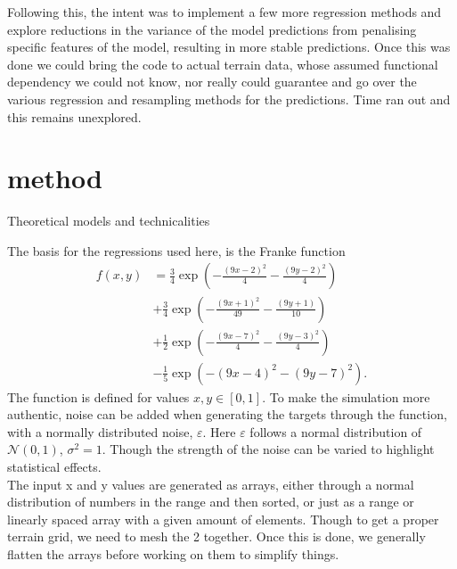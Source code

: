 \documentclass[12pt]{revtex4-2}
\begin{document}
Following this, the intent was to implement a few more regression methods and explore
reductions in the variance of the model predictions from penalising specific features 
of the model, resulting in more stable predictions. Once this was done we could bring the
code to actual terrain data, whose assumed functional dependency we could not know, nor
really could guarantee and go over the various regression and resampling methods for 
the predictions. Time ran out and this remains unexplored. 

\section{method}
Theoretical models and technicalities

The basis for the regressions used here, is the Franke function\cite{franke1979critical}
\begin{align}
 f(x,y) &= \frac{3}{4}\exp{\left(-\frac{(9x-2)^2}{4} - \frac{(9y-2)^2}{4}\right)} 
	\nonumber\\
		&+\frac{3}{4}\exp{\left(-\frac{(9x+1)^2}{49}- \frac{(9y+1)}{10}\right)} 
	\nonumber\\
		&+\frac{1}{2}\exp{\left(-\frac{(9x-7)^2}{4} - \frac{(9y-3)^2}{4}\right)} 
	\nonumber\\
		&-\frac{1}{5}\exp{\left(-(9x-4)^2 - (9y-7)^2\right) }.
\label{franke}
\end{align}
The function is defined for values $x, y \in [0, 1]$. To make the simulation more 
authentic, noise can be added when generating the targets through the function, with a
normally distributed noise, $\varepsilon$. Here $\varepsilon$ follows a normal 
distribution of $\mathcal{N}(0, 1)$, $\sigma^2=1$. Though the strength of the noise can 
be varied to highlight statistical effects. \\

The input x and y values are generated as arrays, either through a normal distribution 
of numbers in the range and then sorted, or just as a range or linearly spaced array 
with a given amount of elements. Though to get a proper terrain grid, we need to mesh 
the 2 together. Once this is done, we generally flatten the arrays before working on 
them to simplify things. 
\end{document}
